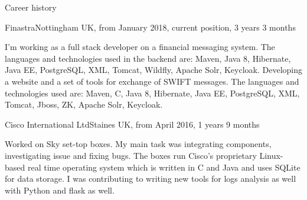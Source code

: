 \documentclass{resume}
\begin{document}
    \begin{rSection}{Career history}

        \begin{rSubsection}{Finastra}{Nottingham UK, from January 2018, current position, 3 years 3 months}{}{}
            \item[]
            I'm working as a full stack developer on a financial messaging system.
            The languages and technologies used in the backend are: Maven, Java 8, Hibernate, Java EE, PostgreSQL, XML, Tomcat, Wildfly, Apache Solr, Keycloak.
            Developing a website and a set of tools for exchange of SWIFT messages.
            The languages and technologies used are: Maven, C, Java 8, Hibernate, Java EE, PostgreSQL, XML, Tomcat, Jboss, ZK, Apache Solr, Keycloak.
        \end{rSubsection}


        \begin{rSubsection}{Cisco International Ltd}{Staines UK, from April 2016, 1 years 9 months}{}{}
            \item[]

            Worked on Sky set-top boxes.
            My main task was integrating components, investigating issue and fixing bugs.
            The boxes run Cisco's proprietary Linux-based real time operating system which is written in C and Java
            and uses SQLite for data storage.
            I was contributing to writing new tools for logs analysis as well with Python and flask as well.


\end{rSubsection}
\end{rSection}
\end{document}
